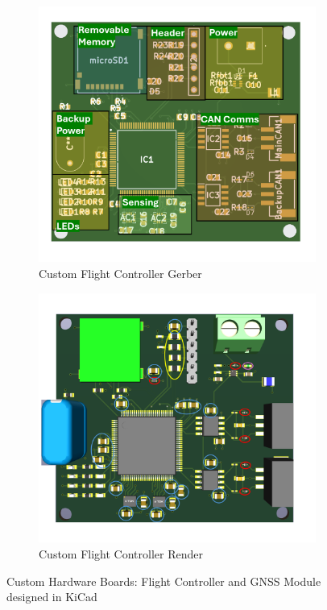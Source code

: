 \begin{figure}[htbp]
  
  \begin{subfigure}[b]{0.48\textwidth}
    \includegraphics[width=\textwidth]{figs/Thomas/Custom Hardware/FC gerber.png}
    \caption{Custom Flight Controller Gerber}
    \label{fig:fc_gerber}
  \end{subfigure}
  \hfill
  \begin{subfigure}[b]{0.48\textwidth}
    \includegraphics[width=\textwidth]{figs/Thomas/Custom Hardware/FC render.png}
    \caption{Custom Flight Controller Render}
    \label{fig:fc_render}
  \end{subfigure}

  \vspace{1em} %
  \caption{Custom Hardware Boards: Flight Controller and GNSS Module designed in KiCad}
  \label{fig:custom_hardware_overview}
\end{figure}

